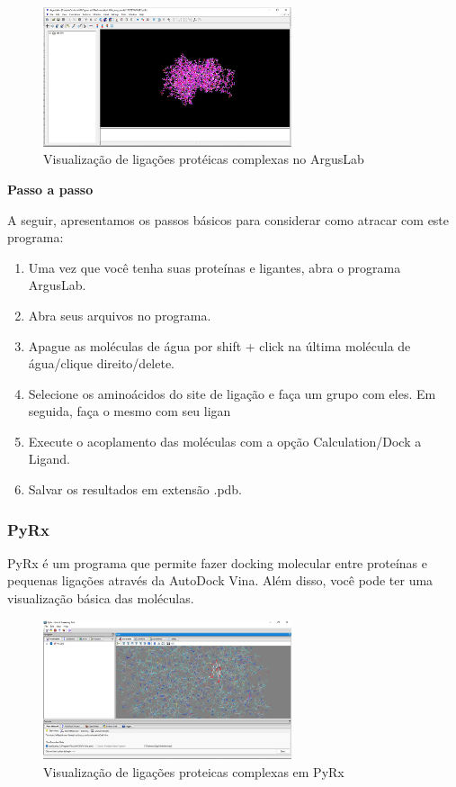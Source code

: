 \documentclass[11pt, letterpaper, portuguese]{article}
\begin{document}
\begin{figure}
	    \centering
		\caption{Visualização de ligações protéicas complexas no ArgusLab  \cite{Thompson_2004}}
		\includegraphics[width=0.65\textwidth]{argus}
	\end{figure}     
	\par{\textbf{Passo a passo}}
        \par{A seguir, apresentamos os passos básicos para considerar como atracar com este programa:}
            \begin{enumerate}[1.]
            \item Uma vez que você tenha suas proteínas e ligantes, abra o programa ArgusLab.
            \item Abra seus arquivos no programa.
            \item Apague as moléculas de água por shift + click na última molécula de água/clique direito/delete.
            \item Selecione os aminoácidos do site de ligação e faça um grupo com eles. Em seguida, faça o mesmo com seu ligan
            \item Execute o acoplamento das moléculas com a opção Calculation/Dock a Ligand.
            \item Salvar os resultados em extensão .pdb.
            \end{enumerate}

        \subsubsection{PyRx}
        \par PyRx é um programa que permite fazer docking molecular entre proteínas e pequenas ligações através da AutoDock Vina. Além disso, você pode ter uma visualização básica das moléculas.
       
\begin{figure}
	    \centering
		\caption{Visualização de ligações proteicas complexas em PyRx  \cite{Dallakyan_2014}}
		\includegraphics[width=0.65\textwidth]{pyrx.jpg}
	\end{figure}
	
\end{document}
